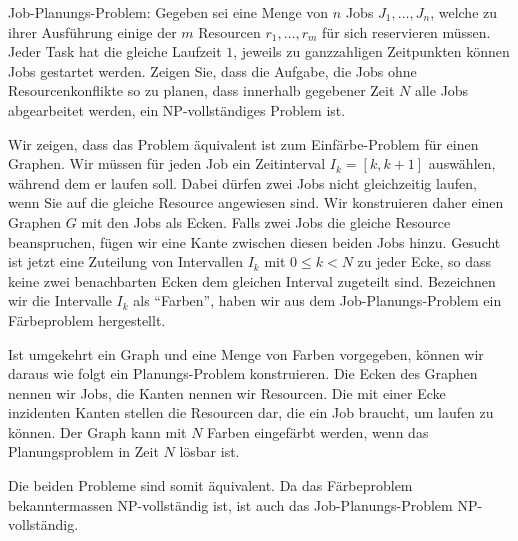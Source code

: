 Job-Planungs-Problem:
Gegeben sei eine Menge von $n$ Jobs $J_1,\dots,J_n$, welche zu ihrer
Ausführung einige der $m$ Resourcen $r_1,\dots,r_m$ für sich reservieren
müssen. Jeder Task hat die gleiche Laufzeit $1$, jeweils zu ganzzahligen
Zeitpunkten können Jobs gestartet werden. Zeigen Sie, dass die
Aufgabe, die Jobs ohne Resourcenkonflikte so zu planen, dass innerhalb
gegebener Zeit $N$ alle Jobs abgearbeitet werden, ein NP-vollständiges Problem
ist.


\begin{loesung}
Wir zeigen, dass das Problem äquivalent ist zum Einfärbe-Problem für
einen Graphen. Wir müssen für jeden Job ein Zeitinterval $I_k=[k,k+1]$
auswählen, während dem er laufen soll. Dabei dürfen zwei Jobs nicht
gleichzeitig laufen, wenn Sie auf die gleiche Resource angewiesen sind.
Wir konstruieren daher einen Graphen $G$ mit den Jobs als Ecken. Falls
zwei Jobs die gleiche Resource beanspruchen, fügen wir eine Kante
zwischen diesen beiden Jobs hinzu. Gesucht ist jetzt eine Zuteilung
von Intervallen $I_k$ mit $0\le k< N$ zu jeder Ecke, so dass keine
zwei benachbarten Ecken dem gleichen Interval zugeteilt sind. Bezeichnen
wir die Intervalle $I_k$ als ``Farben'', haben wir aus dem Job-Planungs-Problem
ein Färbeproblem hergestellt.

Ist umgekehrt ein Graph und eine Menge von Farben vorgegeben, können
wir daraus wie folgt ein Planungs-Problem konstruieren. Die Ecken
des Graphen nennen wir Jobs, die Kanten nennen wir Resourcen. Die
mit einer Ecke inzidenten Kanten stellen die Resourcen dar, die ein
Job braucht, um laufen zu können. Der Graph kann mit $N$ Farben
eingefärbt werden, wenn das Planungsproblem in Zeit $N$ lösbar ist.

Die beiden Probleme sind somit äquivalent. Da das Färbeproblem
bekanntermassen NP-vollständig ist, ist auch das Job-Planungs-Problem
NP-vollständig.
\end{loesung}
